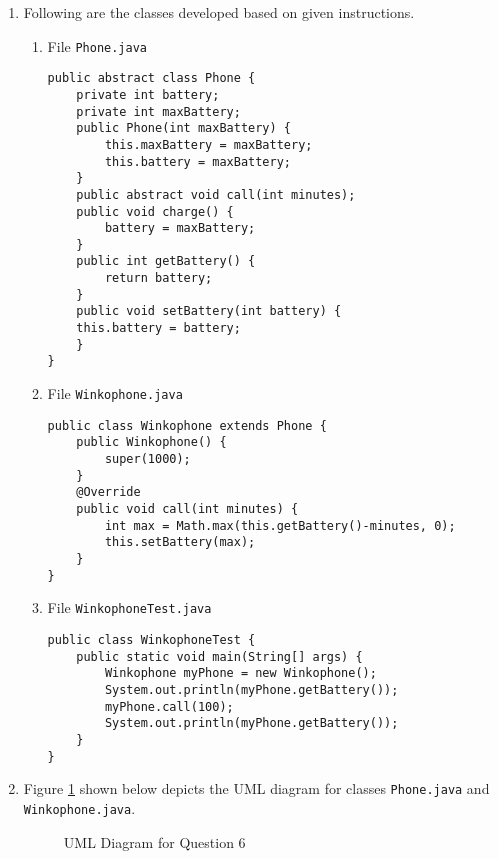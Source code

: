 \begin{enumerate}[label=(\alph*)]
\item Following are the classes developed based on given instructions.
\begin{enumerate}[label=\arabic*.]
\item File \texttt{Phone.java}

\lstset{language=java, tabsize=2}
\begin{lstlisting}
public abstract class Phone {
	private int battery;
	private int maxBattery;
	public Phone(int maxBattery) {
		this.maxBattery = maxBattery;
		this.battery = maxBattery;
	}
	public abstract void call(int minutes);
	public void charge() {
		battery = maxBattery;
	}
	public int getBattery() {
		return battery;
	}
	public void setBattery(int battery) {
	this.battery = battery;
	}
}
\end{lstlisting}

\item File \texttt{Winkophone.java}

\lstset{language=java, tabsize=2}
\begin{lstlisting}
public class Winkophone extends Phone {
	public Winkophone() {
		super(1000);
	}
	@Override
	public void call(int minutes) {
		int max = Math.max(this.getBattery()-minutes, 0);
		this.setBattery(max);
	}
}
\end{lstlisting}

\item File \texttt{WinkophoneTest.java}

\lstset{language=java, tabsize=2}
\begin{lstlisting}
public class WinkophoneTest {
	public static void main(String[] args) {
		Winkophone myPhone = new Winkophone();
		System.out.println(myPhone.getBattery());
		myPhone.call(100);
		System.out.println(myPhone.getBattery());
	}
}
\end{lstlisting}
\end{enumerate}

\item Figure \ref{fig3} shown below depicts the UML diagram for classes \texttt{Phone.java} and \texttt{Winkophone.java}.
	\begin{figure}[H]
	\centering
	\caption{UML Diagram for Question 6}\label{fig3}
	\end{figure}
\end{enumerate}
